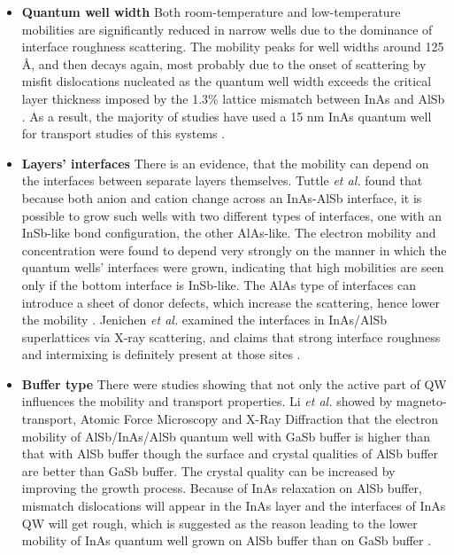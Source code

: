 \documentclass[titlepage,a4paper]{book}
\newcommand{\wciecie}{\quad\phantom{v}}
\begin{document}
\begin{itemize}
\item \textbf{Quantum well width} \newline  
\wciecie
Both room-temperature and low-temperature mobilities are significantly reduced in narrow wells due to the dominance of interface roughness scattering. The mobility peaks for well widths around 125 Å, and then decays again, most probably due to the onset of scattering by misfit dislocations nucleated as the quantum well width exceeds the critical layer thickness imposed by the 1.3\% lattice mismatch between InAs and AlSb \cite{Bolognesi_Width}. As a result, the majority of studies have used a 15 nm InAs quantum well for transport studies of this systems \cite{Li_InAs}.

\item \textbf{Layers' interfaces} \newline
\wciecie
There is an evidence, that the mobility can depend on the interfaces between separate layers themselves. Tuttle \textit{et al.} \cite{Tuttle_Interface} found that because both anion and cation change across an InAs-AlSb interface, it is possible to grow such wells with two different types of interfaces, one with an InSb-like bond configuration, the other AlAs-like. The electron mobility and concentration were found to depend very strongly on the manner in which the quantum wells' interfaces were grown, indicating that high mobilities are seen only if the bottom interface is InSb-like. The AlAs type of interfaces can introduce a sheet of donor defects, which increase the scattering, hence lower the mobility \cite{Tuttle_Interface}. Jenichen \textit{et al.} examined the interfaces in InAs/AlSb superlattices via X-ray scattering, and claims that strong interface roughness and intermixing is definitely present at those sites \cite{Jenichen_Interfaces}.

\item \textbf{Buffer type} \newline
\wciecie
There were studies showing that not only the active part of QW influences the mobility and transport properties. Li \textit{et al.} \cite{Li_InAs} showed by magneto-transport, Atomic Force Microscopy and X-Ray Diffraction that the electron mobility of AlSb/InAs/AlSb quantum well with GaSb buffer is higher than that with AlSb buffer though the surface and crystal qualities of AlSb buffer are better than GaSb buffer. The crystal quality can be increased by improving the growth process. Because of InAs relaxation on AlSb buffer, mismatch dislocations will appear in the InAs layer and the interfaces of InAs QW will get rough, which is suggested as the reason leading to the lower mobility of InAs quantum well grown on AlSb buffer than on GaSb buffer \cite{Li_InAs}. 


\end{itemize}
\end{document}
